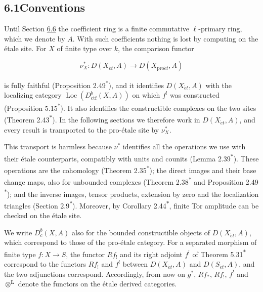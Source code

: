 \documentclass[11pt]{article}
\newcommand{\bpout}[1]{#1\textsuperscript{\hyperlink{bp-outside}{\ensuremath{\ast}}}}
\providecommand{\Dbc}{}\renewcommand{\Dbc}{D^b_c}
\providecommand{\Loc}{}\renewcommand{\Loc}{\operatorname{Loc}}
\begin{document}
\subsection*{\texorpdfstring{6.1\quad Conventions}{6.1 Conventions}}
\label{bp3}%
\label{bp4}%
Until Section \hyperref[bp56]{6.6} the coefficient ring is a finite commutative \(\ell\)-primary ring, which we denote by \(A\). With such coefficients nothing is lost by computing on the étale site. For \(X\) of finite type over \(k\), the comparison functor

\[
\nu_X^*:D(X_{\acute{e}t},A)\longrightarrow D(X_{\mathrm{pro}\acute{e}t},A)
\]

is fully faithful (Proposition \bpout{2.49}), and it identifies \(D(X_{\acute{e}t},A)\) with the localizing category \(\Loc(D^b_{\mathrm{ctf}}(X,A))\) on which \(f^!\) was constructed (Proposition \bpout{5.15}). It also identifies the constructible complexes on the two sites (Theorem \bpout{2.43}). In the following sections we therefore work in \(D(X_{\acute{e}t},A)\), and every result is transported to the pro-étale site by \(\nu_X^*\).

This transport is harmless because \(\nu^*\) identifies all the operations we use with their étale counterparts, compatibly with units and counits (Lemma \bpout{2.39}). These operations are the cohomology (Theorem \bpout{2.35}); the direct images and their base change maps, also for unbounded complexes (Theorem \bpout{2.38} and Proposition \bpout{2.49}); and the inverse images, tensor products, extension by zero and the localization triangles (Section \bpout{2.9}). Moreover, by Corollary \bpout{2.44}, finite Tor amplitude can be checked on the étale site.

We write \(\Dbc(X,A)\) also for the bounded constructible objects of \(D(X_{\acute{e}t},A)\), which correspond to those of the pro-étale category. For a separated morphism of finite type \(f:X\to S\), the functor \(Rf_!\) and its right adjoint \(f^!\) of Theorem \bpout{5.31} correspond to the functors \(Rf_!\) and \(f^!\) between \(D(X_{\acute{e}t},A)\) and \(D(S_{\acute{e}t},A)\), and the two adjunctions correspond. Accordingly, from now on \(g^*\), \(Rf_*\), \(Rf_!\), \(f^!\) and \(\otimes^{\mathbf L}\) denote the functors on the étale derived categories.
\end{document}
